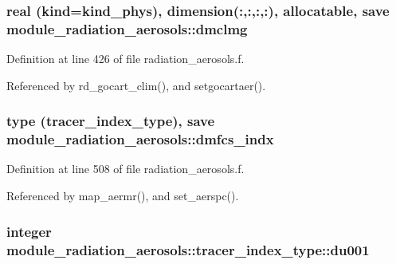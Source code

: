 \subsubsection[{\texorpdfstring{dmclmg}{dmclmg}}]{\setlength{\rightskip}{0pt plus 5cm}real (kind=kind\+\_\+phys), dimension(\+:,\+:,\+:,\+:), allocatable, save module\+\_\+radiation\+\_\+aerosols\+::dmclmg\hspace{0.3cm}{\ttfamily [private]}}\hypertarget{group__module__radiation__aerosols_ga123d552c7f98f7371565f4e2017efd45}{}\label{group__module__radiation__aerosols_ga123d552c7f98f7371565f4e2017efd45}


Definition at line 426 of file radiation\+\_\+aerosols.\+f.



Referenced by rd\+\_\+gocart\+\_\+clim(), and setgocartaer().

\subsubsection[{\texorpdfstring{dmfcs\+\_\+indx}{dmfcs_indx}}]{\setlength{\rightskip}{0pt plus 5cm}type (tracer\+\_\+index\+\_\+type), save module\+\_\+radiation\+\_\+aerosols\+::dmfcs\+\_\+indx\hspace{0.3cm}{\ttfamily [private]}}\hypertarget{group__module__radiation__aerosols_gad6c4782fbaae13df20891197b67568ec}{}\label{group__module__radiation__aerosols_gad6c4782fbaae13df20891197b67568ec}


Definition at line 508 of file radiation\+\_\+aerosols.\+f.



Referenced by map\+\_\+aermr(), and set\+\_\+aerspc().

\subsubsection[{\texorpdfstring{du001}{du001}}]{\setlength{\rightskip}{0pt plus 5cm}integer module\+\_\+radiation\+\_\+aerosols\+::tracer\+\_\+index\+\_\+type\+::du001\hspace{0.3cm}{\ttfamily [private]}}\hypertarget{group__module__radiation__aerosols_gaf4355efd112704adbaeab5a3fd1d7912}{}\label{group__module__radiation__aerosols_gaf4355efd112704adbaeab5a3fd1d7912}


